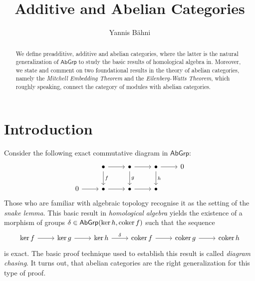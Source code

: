 

\title{Additive and Abelian Categories}
\author{Yannis B\"{a}hni}
\address[Yannis B\"{a}hni]{University of Zurich, R\"{a}mistrasse 71, 8006 Zurich}



\begin{abstract}
	We define preadditive, additive and abelian categories, where the latter is the natural generalization of $\mathsf{AbGrp}$ to study the basic results of homological algebra in. Moreover, we state and comment on two foundational results in the theory of abelian categories, namely the \emph{Mitchell Embedding Theorem} and the \emph{Eilenberg-Watts Theorem}, which roughly speaking, connect the category of modules with abelian categories.
\end{abstract}

\maketitle

\tableofcontents

\section{Introduction}
Consider the following exact commutative diagram in $\mathsf{AbGrp}$:
\begin{equation*}
	\begin{tikzcd}
		& \bullet \arrow[r]\arrow[d,"f"] & \bullet \arrow[r]\arrow[d,"g"] & \bullet \arrow[r]\arrow[d,"h"] & 0\\
		0 \arrow[r] & \bullet \arrow[r] & \bullet \arrow[r] & \bullet
	\end{tikzcd}
\end{equation*}
Those who are familiar with algebraic topology recognise it as the setting of the \emph{snake lemma}. This basic result in \emph{homological algebra} yields the existence of a morphism of groups $\delta \in \mathsf{AbGrp}(\ker h,\operatorname{coker} f)$ such that the sequence
\begin{equation*}
	\begin{tikzcd}
			\ker f \arrow[r] & \ker g \arrow[r] & \ker h \arrow[r,"\delta"] & \coker f \arrow[r] & \coker g \arrow[r] & \coker h
	 \end{tikzcd}
\end{equation*}
\noindent is exact. The basic proof technique used to establish this result is called \emph{diagram chasing}. It turns out, that abelian categories are the right generalization for this type of proof.

